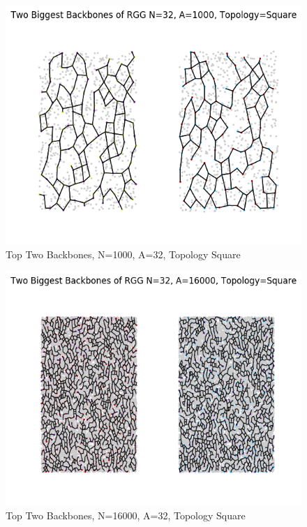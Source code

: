 \documentclass{article}
\begin{document}
    \begin{figure}
      \centering
      \label{backbone_32_1000_Square}
      \includegraphics[width=1 \textwidth]{backbone/backbone_32_1000_Square.png}
      \caption{Top Two Backbones, N=1000, A=32, Topology Square}
    \end{figure}

    \begin{figure}
      \centering
      \label{backbone_32_16000_Square}
      \includegraphics[width=1 \textwidth]{backbone/backbone_32_16000_Square.png}
      \caption{Top Two Backbones, N=16000, A=32, Topology Square}
    \end{figure}
\end{document}
